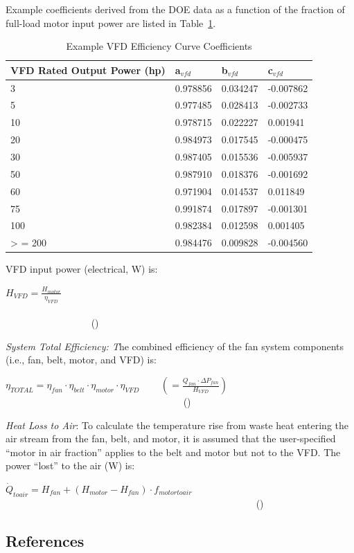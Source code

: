 Example coefficients derived from the DOE data as a function of the fraction of full-load motor input power are listed in Table~\ref{table:example-vfd-efficiency-curve-coefficients}.

\begin{longtable}[c]{@{}llll@{}}
\caption{Example VFD Efficiency Curve Coefficients \protect \label{table:example-vfd-efficiency-curve-coefficients}}\\
\toprule 
VFD Rated Output Power (hp) & a\(_{vfd}\) & b\(_{vfd}\) & c\(_{vfd}\) \tabularnewline \midrule
\endhead
3 & 0.978856 & 0.034247 & -0.007862 \tabularnewline
5 & 0.977485 & 0.028413 & -0.002733 \tabularnewline
10 & 0.978715 & 0.022227 & 0.001941 \tabularnewline
20 & 0.984973 & 0.017545 & -0.000475 \tabularnewline
30 & 0.987405 & 0.015536 & -0.005937 \tabularnewline
50 & 0.987910 & 0.018376 & -0.001692 \tabularnewline
60 & 0.971904 & 0.014537 & 0.011849 \tabularnewline
75 & 0.991874 & 0.017897 & -0.001301 \tabularnewline
100 & 0.982384 & 0.012598 & 0.001405 \tabularnewline
>  = 200 & 0.984476 & 0.009828 & -0.004560 \tabularnewline
\bottomrule
\end{longtable}

VFD input power (electrical, W) is:

\({H_{VFD}} = \frac{{{H_{motor}}}}{{{\eta_{VFD}}}}\) ~~~~~~~~~~~~~~~~~~~~~~~~~~~~~~~~~~~~~~~~~~~~~~~~~~~~~~~~~~~~~~~~~~~~~~~~~~~~~~~~~~~~~~~~~ ()

\emph{System Total Efficiency: T}he combined efficiency of the fan system components (i.e., fan, belt, motor, and VFD) is:

\({\eta_{TOTAL}} = {\eta_{fan}} \cdot {\eta_{belt}} \cdot {\eta_{motor}} \cdot {\eta_{VFD}}\) ~~~ \(\left( { = \frac{{{Q_{fan}} \cdot \Delta {P_{fan}}}}{{{H_{VFD}}}}} \right)\) ~~~~~~~~~~~~~~~~~~~~~~~~~~~~~~~~~~~~ ()

\emph{Heat Loss to Air}: To calculate the temperature rise from waste heat entering the air stream from the fan, belt, and motor, it is assumed that the user-specified ``motor in air fraction'' applies to the belt and motor but not to the VFD. The power ``lost'' to the air (W) is:

\({\dot Q_{toair}} = {H_{fan}} + \left( {{H_{motor}} - {H_{fan}}} \right) \cdot {f_{motortoair}}\) ~~~~~~~~~~~~~~~~~~~~~~~~~~~~~~~~~~~~~~~~~~~~~~~~~~~ ()

\subsection{References}\label{references-002}

